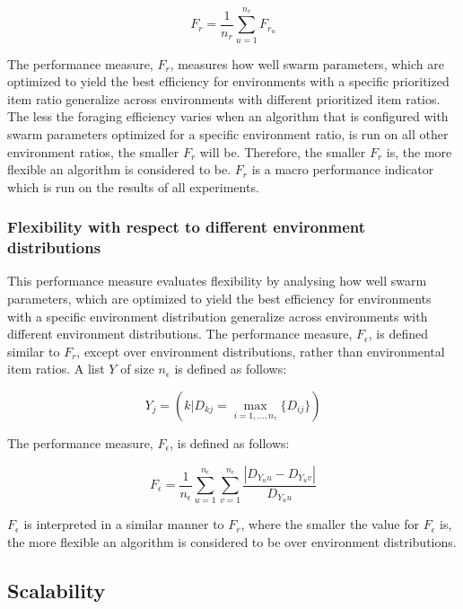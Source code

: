\documentclass[preprint,12pt]{elsarticle}
\begin{document}
\begin{equation}
F_r = \dfrac{1}{n_r}\sum_{u=1}^{n_r} F_{r_u}
\end{equation}

The performance measure, $F_r$, measures how well swarm parameters, which are optimized to yield the best efficiency for environments with a specific prioritized item ratio generalize across environments with different prioritized item ratios. The less the foraging efficiency varies when an algorithm that is configured with swarm parameters optimized for a specific environment ratio, is run on all other environment ratios, the smaller $F_r$ will be. Therefore, the smaller $F_r$ is, the more flexible an algorithm is considered to be. $F_r$ is a macro performance indicator which is run on the results of all experiments. 


\subsubsection{Flexibility with respect to different environment distributions}
\label{setup:flexibility:environmentdistributions}


This performance measure evaluates flexibility by analysing how well swarm parameters, which are optimized to yield the best efficiency for environments with a specific environment distribution generalize across environments with different environment distributions. The performance measure, $F_{\epsilon}$, is defined similar to $F_r$, except over environment distributions, rather than environmental item ratios. A list $Y$ of size $n_\epsilon$ is defined as follows:

\begin{equation}
Y_j = ( k | D_{kj} = \max_{i=1,...,n_\tau}\{D_{ij}\} )
\end{equation}

The performance measure, $F_\epsilon$, is defined as follows:

\begin{equation}
F_\epsilon = \dfrac{1}{n_\epsilon}\sum_{u=1}^{n_\epsilon} \sum_{v=1}^{n_\epsilon}\dfrac{|D_{Y_uu}- D_{Y_uv}|}{D_{Y_uu}}
\end{equation}

$F_\epsilon$ is interpreted in a similar manner to $F_r$, where the smaller the value for $F_\epsilon$ is, the more flexible an algorithm is considered to be over environment distributions.

\subsection{Scalability}
\label{setup:scalability}
\end{document}
